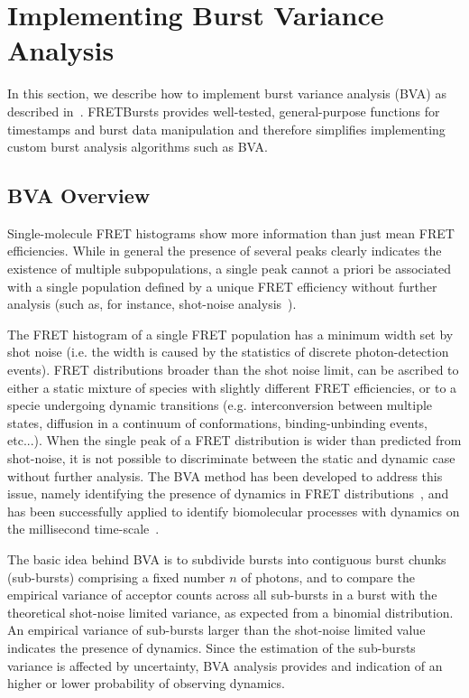 \section{Implementing Burst Variance Analysis}

\label{sec:bva}
In this section, we describe how to implement burst variance analysis (BVA) 
as described in~\cite{Torella_2011}.
FRETBursts provides well-tested, general-purpose functions for timestamps and burst data 
manipulation and therefore simplifies implementing custom burst analysis algorithms such as BVA.

\subsection{BVA Overview}
Single-molecule FRET histograms show more information than just mean FRET efficiencies. 
While in general the presence of several peaks clearly indicates the existence of 
multiple subpopulations, a single peak cannot a priori be associated with 
a single population defined by a unique FRET efficiency without further analysis 
(such as, for instance, shot-noise analysis~\cite{Nir_2006,Antonik2006}).

The FRET histogram of a single FRET population has a minimum width set by shot noise 
(i.e. the width is caused by the statistics of discrete photon-detection events). 
FRET distributions broader than the shot noise limit, 
can be ascribed to either a static mixture of species with slightly different FRET efficiencies, 
or to a specie undergoing dynamic transitions (e.g. interconversion between multiple states,
diffusion in a continuum of conformations, binding-unbinding events, etc...).
When the single peak of a FRET distribution is wider than predicted from shot-noise, 
it is not possible to discriminate between the static and dynamic case without further analysis.
The BVA method has been developed to address this issue, namely identifying the presence of dynamics 
in FRET distributions~\cite{Torella_2011}, 
and has been successfully applied to identify biomolecular processes with 
dynamics on the millisecond time-scale~\cite{Torella_2011, Robb_2013}.

The basic idea behind BVA is to subdivide bursts into contiguous burst chunks (sub-bursts)
comprising a fixed number $n$ of photons,
and to compare the empirical variance of acceptor counts across all sub-bursts in a burst 
with the theoretical shot-noise limited variance, as expected from a binomial distribution.
An empirical variance of sub-bursts larger than the shot-noise limited value indicates
the presence of dynamics. Since the estimation of the sub-bursts variance is affected
by uncertainty, BVA analysis provides and indication of an higher or lower probability
of observing dynamics.

